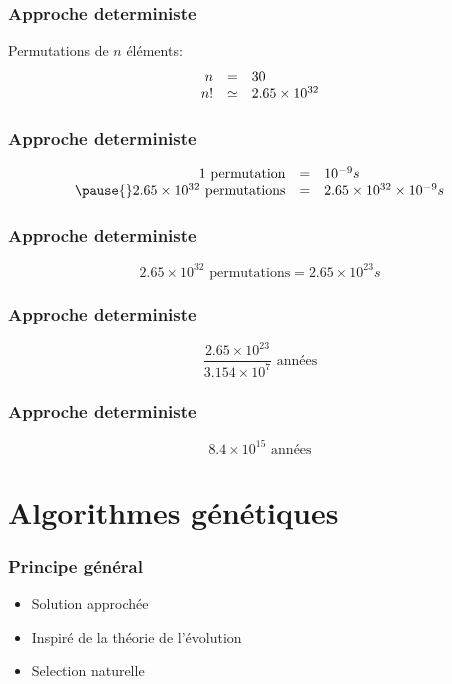 \documentclass{beamer}
\begin{document}
\begin{frame}
  \frametitle{Approche deterministe}
  Permutations de $n$ éléments:
  \[
  \begin{array}{r c l}
  n &=& 30 \\
  n! &\simeq& 2.65 \times 10^{32}
  \end{array}
  \]
\end{frame}

\begin{frame}
  \frametitle{Approche deterministe}
  \[
  \begin{array}{r c l}
  1 \text{ permutation} &=& 10^{-9}s \\ \pause{}
  2.65 \times 10^{32} \text{ permutations} &=& 2.65 \times 10^{32} \times 10^{-9}s
  \end{array}
  \]
\end{frame}

\begin{frame}
  \frametitle{Approche deterministe}
  \[
  2.65 \times 10^{32} \text{ permutations} = 2.65 \times 10^{23}s
  \]
\end{frame}

\begin{frame}
  \frametitle{Approche deterministe}
  \[
  \frac{2.65 \times 10^{23}}{3.154 \times 10^{7}} \text{ années}
  \]

\end{frame}

\begin{frame}
  \frametitle{Approche deterministe}
  \[
  8.4 \times 10^{15} \text{ années}
  \]
\end{frame}

\section{Algorithmes génétiques}

\begin{frame}
  \frametitle{Principe général}
  \begin{itemize}
    \item Solution approchée
    \item Inspiré de la théorie de l'évolution
    \item Selection naturelle
  \end{itemize}
\end{frame}
\end{document}
